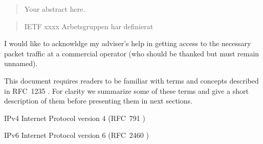 \documentclass[12pt,a4paper,twoside,openright]{book}
\begin{document}
\frontmatter
{}
\begin{abstract}
\label{sec:abstract}
\setcounter{page}{1}


Your abstract here.

\end{abstract}
{}
\begin{abstract}
\label{sec:swedish_abstract}


IETF xxxx Arbetsgruppen har definierat 
\end{abstract}

\begin{acknowledgements}
I would like to acknowldge my adviser's help in getting access to the
necessary packet traffic at a commercial operator (who should be thanked but
must remain unnamed).
\end{acknowledgements}

\tableofcontents

\listoffigures

\listoftables

\listoflistings


\renewcommand\abbreviationsname{List of Acronyms and Abbreviations}
\begin{abbreviations}
\label{list-of-acronyms-and-abbreviations}

This document requires readers to be familiar with terms and concepts described in \mbox{RFC~1235} \cite{john_ioannidis_coherent_1991}. For clarity we summarize some of these terms and give a short description of them before presenting them in next sections.

\begin{basedescript}{\desclabelstyle{\pushlabel}\desclabelwidth{10em}}
\item[IPv4]					Internet Protocol version 4 (RFC~791 \cite{postel_internet_1981})
\item[IPv6]					Internet Protocol version 6 (RFC~2460 \cite{deering_internet_1998})
\end{basedescript}
\end{abbreviations}
\end{document}
